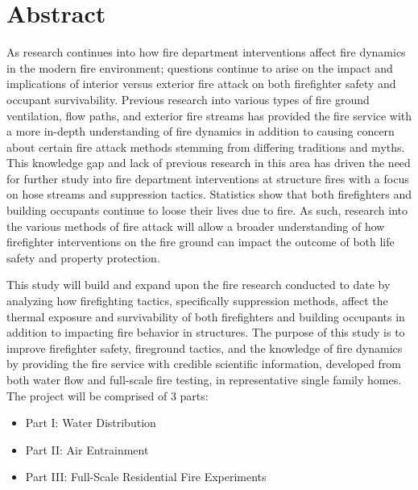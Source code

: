 \documentclass{book}
\begin{document}
\chapter*{\centering Abstract}

As research continues into how fire department interventions affect fire dynamics in the modern fire environment; questions continue to arise on the impact and implications of interior versus exterior fire attack on both firefighter safety and occupant survivability. Previous research into various types of fire ground ventilation, flow paths, and exterior fire streams has provided the fire service with a more in-depth understanding of fire dynamics in addition to causing concern about certain fire attack methods stemming from differing traditions and myths. This knowledge gap and lack of previous research in this area has driven the need for further study into fire department interventions at structure fires with a focus on hose streams and suppression tactics. Statistics show that both firefighters and building occupants continue to loose their lives due to fire. As such, research into the various methods of fire attack will allow a broader understanding of how firefighter interventions on the fire ground can impact the outcome of both life safety and property protection. 

\vspace*{\baselineskip}

This study will build and expand upon the fire research conducted to date by analyzing how firefighting tactics, specifically suppression methods, affect the thermal exposure and survivability of both firefighters and building occupants in addition to impacting fire behavior in structures. The purpose of this study is to improve firefighter safety, fireground tactics, and the knowledge of fire dynamics by providing the fire service with credible scientific information, developed from both water flow and full-scale fire testing, in representative single family homes. The project will be comprised of 3 parts:
\vspace*{\baselineskip}
\begin{itemize}
	\setlength{\itemindent}{0.25in}
	\item Part I:  Water Distribution
	\item Part II: Air Entrainment
	\item Part III: Full-Scale Residential Fire Experiments
	\end{itemize}
\vspace*{\baselineskip}
\end{document}

